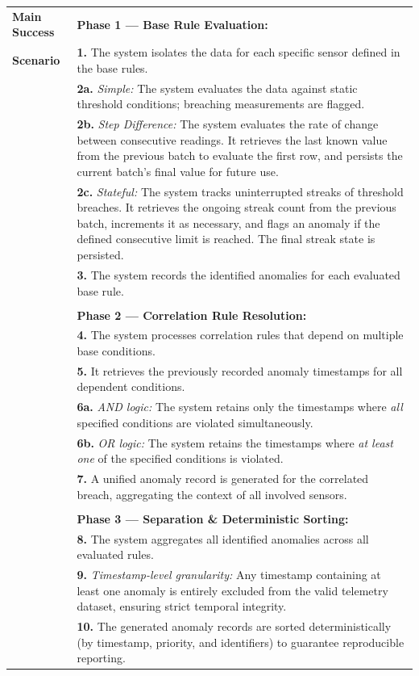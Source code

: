 \documentclass[11pt, a4paper]{article}
\begin{document}
\begin{longtable}{|p{3.5cm}|p{10.5cm}|}
\textbf{Main Success} & \textbf{Phase 1 — Base Rule Evaluation:} \\
\textbf{Scenario} & \textbf{1.} The system isolates the data for each specific sensor defined in the base rules. \\
& \textbf{2a.} \textit{Simple:} The system evaluates the data against static threshold conditions; breaching measurements are flagged. \\
& \textbf{2b.} \textit{Step Difference:} The system evaluates the rate of change between consecutive readings. It retrieves the last known value from the previous batch to evaluate the first row, and persists the current batch's final value for future use. \\
& \textbf{2c.} \textit{Stateful:} The system tracks uninterrupted streaks of threshold breaches. It retrieves the ongoing streak count from the previous batch, increments it as necessary, and flags an anomaly if the defined consecutive limit is reached. The final streak state is persisted. \\
& \textbf{3.} The system records the identified anomalies for each evaluated base rule. \\
& \\ %
& \textbf{Phase 2 — Correlation Rule Resolution:} \\
& \textbf{4.} The system processes correlation rules that depend on multiple base conditions. \\
& \textbf{5.} It retrieves the previously recorded anomaly timestamps for all dependent conditions. \\
& \textbf{6a.} \textit{AND logic:} The system retains only the timestamps where \textit{all} specified conditions are violated simultaneously. \\
& \textbf{6b.} \textit{OR logic:} The system retains the timestamps where \textit{at least one} of the specified conditions is violated. \\
& \textbf{7.} A unified anomaly record is generated for the correlated breach, aggregating the context of all involved sensors. \\
& \\
& \textbf{Phase 3 — Separation \& Deterministic Sorting:} \\
& \textbf{8.} The system aggregates all identified anomalies across all evaluated rules. \\
& \textbf{9.} \textit{Timestamp-level granularity:} Any timestamp containing at least one anomaly is entirely excluded from the valid telemetry dataset, ensuring strict temporal integrity. \\
& \textbf{10.} The generated anomaly records are sorted deterministically (by timestamp, priority, and identifiers) to guarantee reproducible reporting. \\ \hline


\end{longtable}
\end{document}

